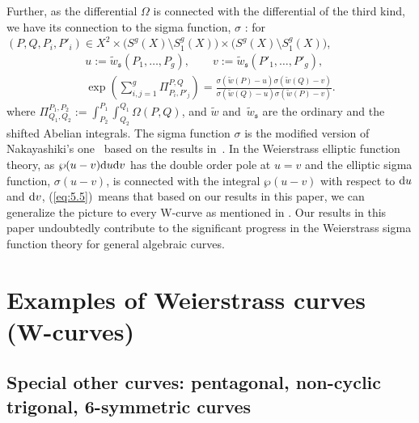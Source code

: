 \documentclass[10pt,a4paper]{amsart}
\def\fs{{\mathfrak s}}
\def\tw{{\widetilde w}}
\numberwithin{equation}{section}
\begin{document}
\begin{Remark}
Further, as the differential $\Omega$ is connected with the differential of the third kind, we have its connection to the sigma function, $\sigma$ \cite[Theorem~4]{KMP2022b}:
for $(P, Q, P_i, P'_i) \in X^2 \times \big(S^g(X)\setminus S^g_1(X)\big) \times
\big(S^g(X)\setminus S^g_1(X)\big)$,
\begin{gather}
	u := \tw_\fs(P_1, \dots, P_g), \qquad
	v := \tw_\fs(P'_1, \dots, P'_g),\nonumber\\
\exp\left(
\sum_{i, j = 1}^g
 \Pi_{P_i, P'_j}^{P, Q} \right)
=
\frac{\sigma(\tw(P) - u) \sigma(\tw(Q) - v)}
 {\sigma(\tw(Q) - u) \sigma(\tw(P) - v)}.
\label{eq:5.5}
\end{gather}
where $\Pi^{P_1, P_2}_{Q_1, Q_2} := \int^{P_1}_{P_2} \int^{Q_1}_{Q_2} \Omega(P, Q)$, and $\tw$ and~$\tw_\fs$ are the ordinary and the shifted Abelian integrals.
The sigma function $\sigma$ is the modified version of Nakayashiki's one~\cite{Nak16} based on the results in~\cite{KMP16}.
In the Weierstrass elliptic function theory, as $\wp(u-v){\rm d}u{\rm d}v$ has the double order pole at $u=v$ and the elliptic sigma function, $\sigma(u-v)$, is connected with the integral $\wp(u-v)$ with respect to ${\rm d}u$ and ${\rm d}v$,
(\ref{eq:5.5})~means that based on our results in this paper, we can generalize the picture to every W-curve as mentioned in \cite[Theorem~4]{KMP2022b}.
Our results in this paper undoubtedly contribute to the significant progress in the Weierstrass sigma function theory for general algebraic curves.
\end{Remark}

\section{Examples of Weierstrass curves (W-curves)}\label{sec:Exmples}

\subsection{Special other curves: pentagonal, non-cyclic trigonal, 6-symmetric curves}\label{2ssc:SpCurve}
\end{document}
